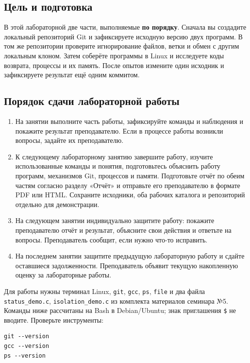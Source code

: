 \label{seminar05}
\subsection{Цель и подготовка}

В этой лабораторной две части, выполняемые \textbf{по порядку}. Сначала вы
создадите локальный репозиторий Git и зафиксируете исходную версию двух
программ. В том же репозитории проверите игнорирование файлов, ветки и
обмен с другим локальным клоном. Затем соберёте программы в Linux и
исследуете коды возврата, процессы и их память. После опытов измените
один исходник и зафиксируете результат ещё одним коммитом.

\subsection{Порядок сдачи лабораторной работы}

\begin{enumerate}
    \item На занятии выполните часть работы, зафиксируйте команды и наблюдения и покажите результат преподавателю. Если в процессе работы возникли вопросы, задайте их преподавателю.
    \item К следующему лабораторному занятию завершите работу, изучите использованные команды и понятия, подготовьтесь объяснить работу программ, механизмов Git, процессов и памяти. Подготовьте отчёт по обеим частям согласно разделу «Отчёт» и отправьте его преподавателю в формате PDF или HTML. Сохраните исходники, оба рабочих каталога и репозиторий отдельно для демонстрации.
    \item На следующем занятии индивидуально защитите работу: покажите преподавателю отчёт и результат, объясните свои действия и ответьте на вопросы. Преподаватель сообщит, если нужно что-то исправить.
    \item На последнем занятии защитите предыдущую лабораторную работу и сдайте оставшиеся задолженности. Преподаватель объявит текущую накопленную оценку за лабораторные работы.
\end{enumerate}

Для работы нужны терминал Linux, \texttt{git}, \texttt{gcc}, \texttt{ps},
\texttt{file} и два файла \texttt{status\_demo.c},
\texttt{isolation\_demo.c} из комплекта материалов семинара №5. Команды ниже
рассчитаны на Bash в Debian/Ubuntu; знак приглашения \texttt{\$} не вводите.
Проверьте инструменты:

\begin{verbatim}
git --version
gcc --version
ps --version
\end{verbatim}

